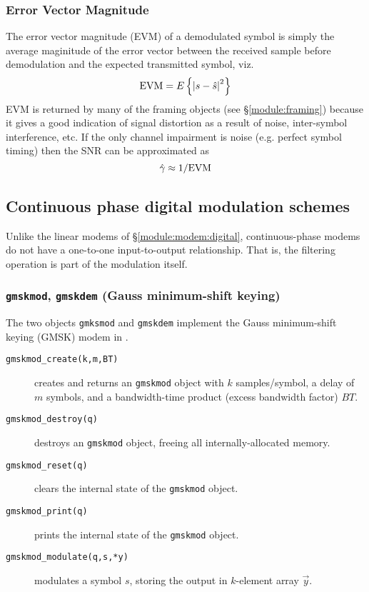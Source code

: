 \subsubsection{Error Vector Magnitude}
\label{module:modem:digital:evm}
The error vector magnitude (EVM) of a demodulated symbol is simply the
average maginitude of the error vector between the received sample
before demodulation and the expected transmitted symbol, viz.
%
\begin{equation}
\label{eqn:modem:evm}
    \textup{EVM} = E\left\{ \left| s - \hat{s} \right|^2 \right\}
\end{equation}
%
EVM is returned by many of the framing objects
(see \S\ref{module:framing})
because it gives a good indication of signal distortion as a result of
noise, inter-symbol interference, etc.
If the only channel impairment is noise (e.g. perfect symbol timing)
then the SNR can be approximated as
\[
    \hat{\gamma} \approx 1 / \textup{EVM}
\]


%
%

\subsection{Continuous phase digital modulation schemes}
\label{module:modem:cpm}

Unlike the linear modems of \S\ref{module:modem:digital},
continuous-phase modems do not have a one-to-one input-to-output
relationship.
That is, the filtering operation is part of the modulation itself.


\subsubsection{{\tt gmskmod}, {\tt gmskdem} (Gauss minimum-shift keying)}
\label{module:modem:cpm:gmskmodem}

The two objects {\tt gmksmod} and {\tt gmskdem} implement the Gauss
minimum-shift keying (GMSK) modem in \liquid.

%
\begin{description}
\item[{\tt gmskmod\_create(k,m,BT)}]
    creates and returns an {\tt gmskmod} object with
    $k$ samples/symbol,
    a delay of $m$ symbols,
    and a bandwidth-time product (excess bandwidth factor) $BT$.
\item[{\tt gmskmod\_destroy(q)}]
    destroys an {\tt gmskmod} object, freeing all internally-allocated
    memory.
\item[{\tt gmskmod\_reset(q)}]
    clears the internal state of the {\tt gmskmod} object.
\item[{\tt gmskmod\_print(q)}]
    prints the internal state of the {\tt gmskmod} object.
\item[{\tt gmskmod\_modulate(q,s,*y)}]
    modulates a symbol $s$, storing the output in $k$-element array
    $\vec{y}$.
\end{description}

